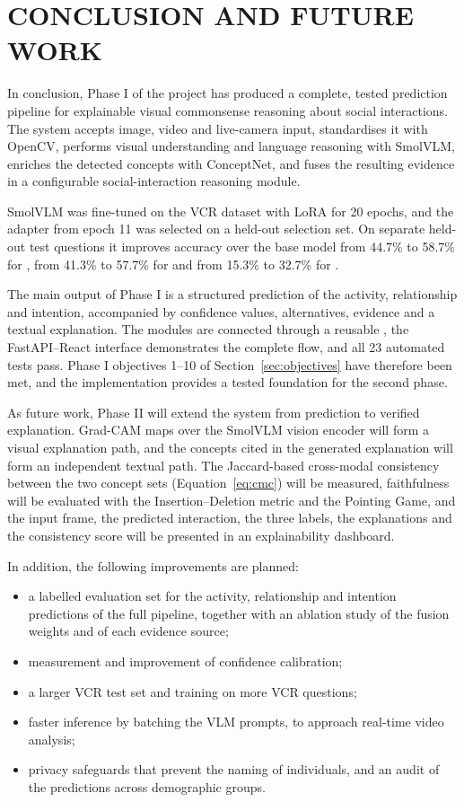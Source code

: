 \chapter{CONCLUSION AND FUTURE WORK}
\label{ch:conclusion}

In conclusion, Phase I of the project has produced a complete, tested prediction pipeline for explainable visual commonsense reasoning about social interactions. The system accepts image, video and live-camera input, standardises it with OpenCV, performs visual understanding and language reasoning with SmolVLM, enriches the detected concepts with ConceptNet, and fuses the resulting evidence in a configurable social-interaction reasoning module.

SmolVLM was fine-tuned on the VCR dataset with LoRA for 20 epochs, and the adapter from epoch 11 was selected on a held-out selection set. On separate held-out test questions it improves accuracy over the base model from 44.7\% to 58.7\% for \QtoA, from 41.3\% to 57.7\% for \QAtoR{} and from 15.3\% to 32.7\% for \QtoAR.

The main output of Phase I is a structured prediction of the activity, relationship and intention, accompanied by confidence values, alternatives, evidence and a textual explanation. The modules are connected through a reusable , the FastAPI--React interface demonstrates the complete flow, and all 23 automated tests pass. Phase I objectives 1--10 of Section~\ref{sec:objectives} have therefore been met, and the implementation provides a tested foundation for the second phase.

As future work, Phase II will extend the system from prediction to verified explanation. Grad-CAM maps over the SmolVLM vision encoder will form a visual explanation path, and the concepts cited in the generated explanation will form an independent textual path. The Jaccard-based cross-modal consistency between the two concept sets (Equation~\ref{eq:cmc}) will be measured, faithfulness will be evaluated with the Insertion--Deletion metric and the Pointing Game, and the input frame, the predicted interaction, the three labels, the explanations and the consistency score will be presented in an explainability dashboard.

In addition, the following improvements are planned:
\begin{itemize}
\item a labelled evaluation set for the activity, relationship and intention predictions of the full pipeline, together with an ablation study of the fusion weights and of each evidence source;
\item measurement and improvement of confidence calibration;
\item a larger VCR test set and training on more VCR questions;
\item faster inference by batching the VLM prompts, to approach real-time video analysis;
\item privacy safeguards that prevent the naming of individuals, and an audit of the predictions across demographic groups.
\end{itemize}
